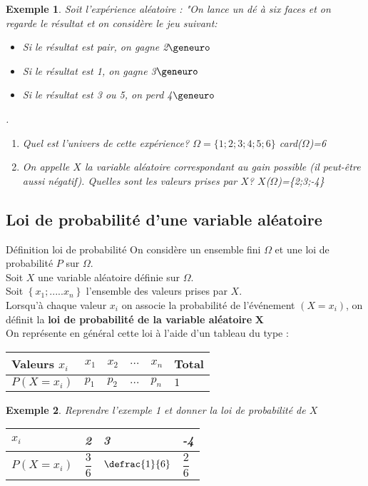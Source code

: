 \documentclass[10pt,a4paper]{article}
\renewcommand{\arraystretch}{}
\theoremstyle{break}
\newtheorem{Ex}{Exemple}
\begin{document}
\newpage
	\begin{Ex}
		Soit l'expérience aléatoire : "On lance un dé à six faces et on regarde le résultat et on considère le jeu suivant:
		\begin{itemize}
			\item Si le résultat est pair, on gagne 2$\geneuro$
			\item Si le résultat est 1, on gagne 3$\geneuro$
			\item Si le résultat est 3 ou 5, on perd 4$\geneuro$
		\end{itemize}.
		\begin{enumerate}
			\item Quel est l'univers de cette expérience? $\Omega = \{1;2;3;4;5;6\}$ card($\Omega$)=6
			\item On appelle $X$ la variable aléatoire correspondant au gain possible (il peut-être aussi négatif). Quelles sont les valeurs prises par $X$? $X$($\Omega$)=\{2;3;-4\}
		\end{enumerate}
	\end{Ex}
	\subsection{Loi de probabilité d'une variable aléatoire}
		\begin{bclogo}[couleur = yellow!30, arrondi = 0.1,logo=\bcbook]{Définition loi de probabilité}
		On considère un ensemble fini $\Omega$ et une loi de probabilité $P$ sur $\Omega$. \\
		Soit $X$ une variable aléatoire définie sur $\Omega$.\\
		Soit $\left\lbrace x_{1} ; ..... x_{n}\right\rbrace $ l'ensemble des valeurs prises par $X$.\\
		Lorsqu'à chaque valeur $x_{i}$  on associe la probabilité de l'événement $(X=x_{i})$, on définit 
		la \textbf{loi de probabilité de la variable aléatoire} $\boldsymbol{X}$\\
		On représente en général cette loi à l'aide d'un tableau du type :\\\begin{center}
			\begin{tabular}{|>{\centering}p{3cm}|>{\centering}p{1cm}|>{\centering}p{1cm}|>{\centering}p{1cm}|>{\centering}p{1cm}|>{\centering}p{2cm}|}
				\hline
				\rule[-1ex]{0pt}{4ex} Valeurs $x_i$ & $x_1$ & $x_2$ & $\dots$ & $x_n$  & Total \tabularnewline\hline
				\rule[-1ex]{0pt}{4ex} $P(X=x_i)$ & $ p_1$ & $ p_2 $ & $ \dots $ & $ p_n $  & $1$\tabularnewline\hline
			\end{tabular}
		\end{center}
		\end{bclogo}
\begin{Ex}
	Reprendre l'exemple 1 et donner la loi de probabilité de $X$\\
	\renewcommand{\arraystretch}{2}
		\begin{tabular}{|p{3cm}|p{3cm}|p{3cm}|p{3cm}|}
		\hline
		$x_i$&2&3&-4\\
		\hline
		$P(X=x_i)$&$\dfrac{3}{6}$&$\defrac{1}{6}$&$\dfrac{2}{6}$ \\
		\hline
	\end{tabular}
\end{Ex}
	
\end{document}
